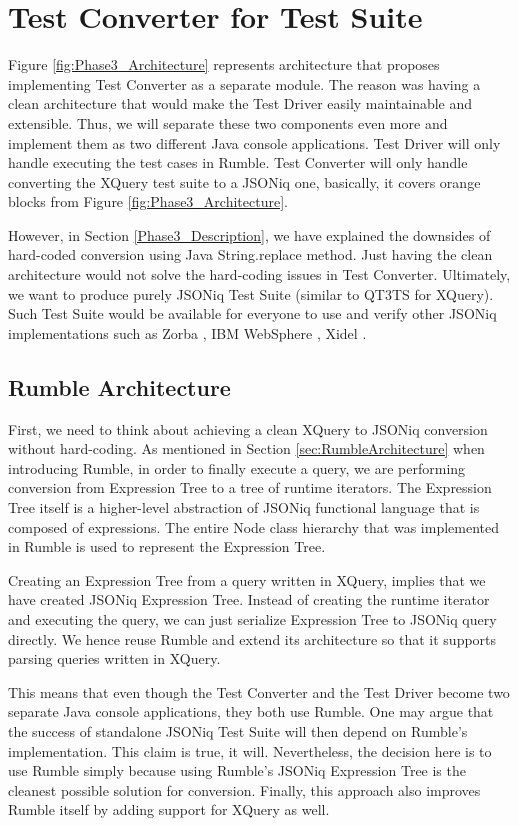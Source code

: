 
\chapter{Test Converter for Test Suite}
Figure \ref{fig:Phase3_Architecture} represents architecture that proposes implementing Test Converter as a separate module. The reason was having a clean architecture that would make the Test Driver easily maintainable and extensible. Thus, we will separate these two components even more and implement them as two different Java console applications. Test Driver will only handle executing the test cases in Rumble. Test Converter will only handle converting the XQuery test suite to a JSONiq one, basically, it covers orange blocks from Figure \ref{fig:Phase3_Architecture}. 

However, in Section \ref{Phase3_Description}, we have explained the downsides of hard-coded conversion using Java String.replace method. Just having the clean architecture would not solve the hard-coding issues in Test Converter. Ultimately, we want to produce purely JSONiq Test Suite (similar to QT3TS for XQuery). Such Test Suite would be available for everyone to use and verify other JSONiq implementations such as Zorba \cite{Zorba}, IBM WebSphere \cite{WebSphere}, Xidel \cite{Xidel}.

\section{Rumble Architecture}
First, we need to think about achieving a clean XQuery to JSONiq conversion without hard-coding. As mentioned in Section \ref{sec:RumbleArchitecture} when introducing Rumble, in order to finally execute a query, we are performing conversion from Expression Tree to a tree of runtime iterators. The Expression Tree itself is a higher-level abstraction of JSONiq functional language that is composed of expressions. The entire Node class hierarchy that was implemented in Rumble is used to represent the Expression Tree.

Creating an Expression Tree from a query written in XQuery, implies that we have created JSONiq Expression Tree. Instead of creating the runtime iterator and executing the query, we can just serialize Expression Tree to JSONiq query directly. We hence reuse Rumble and extend its architecture so that it supports parsing queries written in XQuery. 

This means that even though the Test Converter and the Test Driver become two separate Java console applications, they both use Rumble. One may argue that the success of standalone JSONiq Test Suite will then depend on Rumble's implementation. This claim is true, it will. Nevertheless, the decision here is to use Rumble simply because using Rumble's JSONiq Expression Tree is the cleanest possible solution for conversion. Finally, this approach also improves Rumble itself by adding support for XQuery as well.

